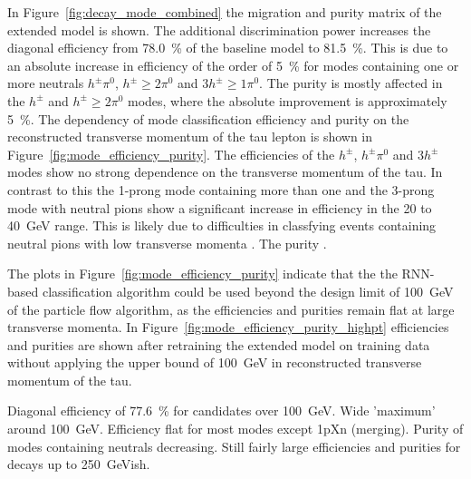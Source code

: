 In Figure~\ref{fig:decay_mode_combined} the migration and purity matrix of the
extended model is shown. The additional discrimination power increases the
diagonal efficiency from \SI{78.0}{\percent} of the baseline model to
\SI{81.5}{\percent}. This is due to an absolute increase in efficiency of the
order of \SI{5}{\percent} for modes containing one or more neutrals
$h^\pm \pi^0$, $h^\pm \geq 2\pi^0$ and $3h^\pm\geq1\pi^0$. The purity is mostly
affected in the $h^\pm$ and $h^\pm \geq 2\pi^0$ modes, where the absolute
improvement is approximately \SI{5}{\percent}. The dependency of mode
classification efficiency and purity on the reconstructed transverse momentum of
the tau lepton is shown in Figure~\ref{fig:mode_efficiency_purity}. The
efficiencies of the $h^\pm$, $h^\pm \pi^0$ and $3h^\pm$ modes show no strong
dependence on the transverse momentum of the tau. In contrast to this the
1-prong mode containing more than one and the 3-prong mode with neutral pions
show a significant increase in efficiency in the \num{20} to \SI{40}{\GeV}
range. This is likely due to difficulties in classfying events containing
neutral pions with low transverse momenta . The purity
.

The plots in Figure~\ref{fig:mode_efficiency_purity} indicate that the the
RNN-based classification algorithm could be used beyond the design limit of
\SI{100}{\GeV} of the particle flow algorithm, as the efficiencies and purities
remain flat at large transverse momenta. In
Figure~\ref{fig:mode_efficiency_purity_highpt} efficiencies and purities are
shown after retraining the extended model on training data without applying the
upper bound of \SI{100}{\GeV} in reconstructed transverse momentum of the tau.

Diagonal efficiency of \SI{77.6}{\percent} for candidates over \SI{100}{\GeV}.
Wide 'maximum' around \SI{100}{\GeV}. Efficiency flat for most modes except 1pXn
(merging). Purity of modes containing neutrals decreasing. Still fairly large
efficiencies and purities for decays up to \SI{250}{\GeV}ish.

